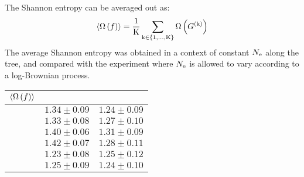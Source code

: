 The Shannon entropy can be averaged out as:
\begin{equation}
\langle \Omega \left( f \right) \rangle = \dfrac{1}{\text{K}}\sum_{\text{k} \in \{1, \hdots, \text{K}\}} \Omega \left( G^{(\text{k})} \right)
\end{equation}
The average Shannon entropy was obtained in a context of constant $N_{\mathrm{e}}$ along the tree, and compared with the experiment where $N_{\mathrm{e}}$ is allowed to vary according to a log-Brownian process.
\begin{table}[H]
	\centering
	\begin{tabu}{|c|c|c|}
		\hline
		$\langle \Omega \left( f \right) \rangle$ &  &  \\
		\hline
		\hline{} & $1.34 \pm 0.09$ & $1.24 \pm 0.09$ \\
		\hline{} & $1.33 \pm 0.08$ & $1.27 \pm 0.10$ \\
		\hline{} & $1.40 \pm 0.06$ & $1.31 \pm 0.09$ \\
		\hline{} & $1.42 \pm 0.07$ & $1.28 \pm 0.11$ \\
		\hline{} & $1.23 \pm 0.08$ & $1.25 \pm 0.12$ \\
		\hline{} & $1.25 \pm 0.09$ & $1.24 \pm 0.10$ \\
		\hline
	\end{tabu}
\end{table}

